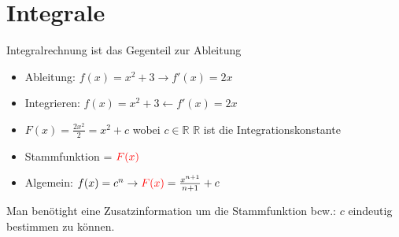 \section{Integrale}

Integralrechnung ist das Gegenteil zur Ableitung

\begin{itemize}
    \item Ableitung: $f(x) = x^2+3 \rightarrow f'(x) = 2x$
    \item Integrieren: $f(x) = x^2+3 \leftarrow f'(x) = 2x$
    \item $F(x) = \frac{2x^2}{2} = x^2+c$ wobei $c \in \mathbb{R}$        $\mathbb{R}$ ist die Integrationskonstante
    \item Stammfunktion = $\textcolor{red}{F(x)}$
    \item Algemein: $f(x) = c^n \rightarrow \textcolor{red}{F(x)} = \frac{x^{n+1}}{n+1}+c$
\end{itemize}

Man benötight eine Zusatzinformation um die Stammfunktion bcw.: $c$ eindeutig bestimmen zu können.

\hfill \break

\break

\break

\break

\break

